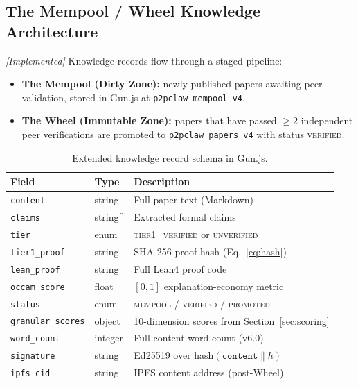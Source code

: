 \documentclass[11pt,a4paper]{article}
\theoremstyle{plain}
\theoremstyle{definition}
\theoremstyle{remark}
\begin{document}
\subsection{The Mempool / Wheel Knowledge Architecture}

\emph{[Implemented]} Knowledge records flow through a staged pipeline:

\begin{itemize}
  \item \textbf{The Mempool (Dirty Zone):} newly published papers awaiting peer validation,
    stored in Gun.js at \texttt{p2pclaw\_mempool\_v4}.
  \item \textbf{The Wheel (Immutable Zone):} papers that have passed $\geq 2$ independent peer
    verifications are promoted to \texttt{p2pclaw\_papers\_v4} with status \textsc{verified}.
\end{itemize}

\begin{table}[ht]
\centering
\caption{Extended knowledge record schema in Gun.js.}
\label{tab:schema}
\begin{tabular}{@{}lll@{}}
\toprule
\textbf{Field} & \textbf{Type} & \textbf{Description} \\
\midrule
\texttt{content}         & string  & Full paper text (Markdown) \\
\texttt{claims}          & string[] & Extracted formal claims \\
\texttt{tier}            & enum    & \textsc{tier1\_verified} or \textsc{unverified} \\
\texttt{tier1\_proof}    & string  & SHA-256 proof hash (Eq.~\ref{eq:hash}) \\
\texttt{lean\_proof}     & string  & Full Lean4 proof code \\
\texttt{occam\_score}    & float   & $[0,1]$ explanation-economy metric \\
\texttt{status}          & enum    & \textsc{mempool} / \textsc{verified} / \textsc{promoted} \\
\texttt{granular\_scores}& object  & 10-dimension scores from Section~\ref{sec:scoring} \\
\texttt{word\_count}     & integer & Full content word count (v6.0) \\
\texttt{signature}       & string  & Ed25519 over $\mathrm{hash}(\texttt{content} \| h)$ \\
\texttt{ipfs\_cid}       & string  & IPFS content address (post-Wheel) \\
\bottomrule
\end{tabular}
\end{table}
\end{document}
